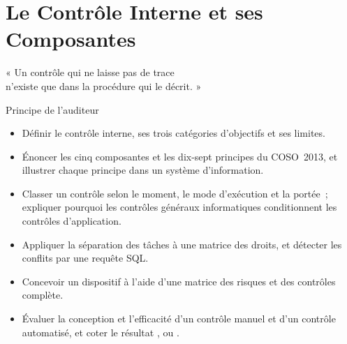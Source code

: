 
\chapter{Le Contrôle Interne et ses Composantes}
\label{chap:controle-interne}

\epigraph{%
    « Un contrôle qui ne laisse pas de trace\\
    n'existe que dans la procédure qui le décrit. »%
}{Principe de l'auditeur}


\begin{boxobjectifs}
\begin{itemize}
    \item Définir le contrôle interne, ses trois catégories d'objectifs et
          ses limites.
    \item Énoncer les cinq composantes et les dix-sept principes du
          COSO~2013, et illustrer chaque principe dans un système
          d'information.
    \item Classer un contrôle selon le moment, le mode d'exécution et la
          portée~; expliquer pourquoi les contrôles généraux informatiques
          conditionnent les contrôles d'application.
    \item Appliquer la séparation des tâches à une matrice des droits, et
          détecter les conflits par une requête SQL.
    \item Concevoir un dispositif à l'aide d'une matrice des risques et des
          contrôles complète.
    \item Évaluer la conception et l'efficacité d'un contrôle manuel et
          d'un contrôle automatisé, et coter le résultat \OUI{}, \NON{} ou
          \NEK{}.
\end{itemize}
\end{boxobjectifs}

